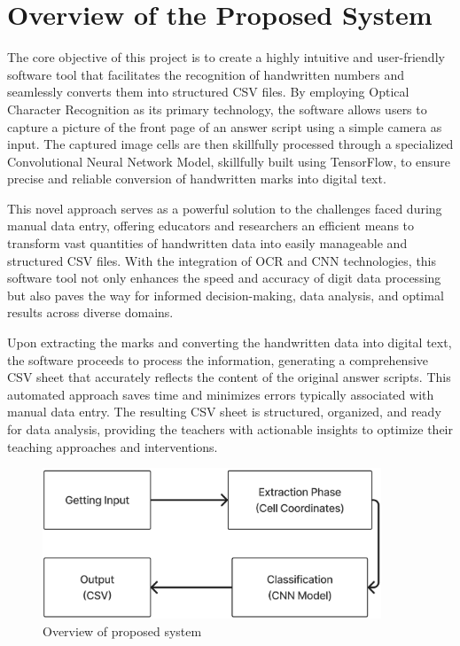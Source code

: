 \section{Overview of the Proposed System}

\noindent The core objective of this project is to create a highly intuitive and user-friendly software tool that facilitates the recognition of handwritten numbers and seamlessly converts them into structured CSV files. By employing Optical Character Recognition as its primary technology, the software allows users to capture a picture of the front page of an answer script using a simple camera as input. The captured image cells are then skillfully processed through a specialized Convolutional Neural Network Model, skillfully built using TensorFlow, to ensure precise and reliable conversion of handwritten marks into digital text.

\noindent This novel approach serves as a powerful solution to the challenges faced during manual data entry, offering educators and researchers an efficient means to transform vast quantities of handwritten data into easily manageable and structured CSV files. With the integration of OCR and CNN technologies, this software tool not only enhances the speed and accuracy of digit data processing but also paves the way for informed decision-making, data analysis, and optimal results across diverse domains.

\noindent Upon extracting the marks and converting the handwritten data into digital text, the software proceeds to process the information, generating a comprehensive CSV sheet that accurately reflects the content of the original answer scripts. This automated approach saves time and minimizes errors typically associated with manual data entry. The resulting CSV sheet is structured, organized, and ready for data analysis, providing the teachers with actionable insights to optimize their teaching approaches and interventions.

\clearpage

\begin{figure}[htbp]
  \centering
  \includegraphics[width=0.9\textwidth]{Images/prop_sys/overview_prop_sys.jpg}
  \caption{Overview of proposed system}
\end{figure}

